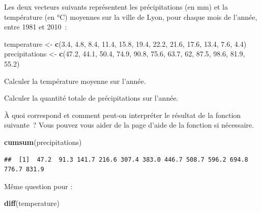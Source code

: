 \documentclass[
  12pt,
]{book}
\newenvironment{Shaded}{\begin{snugshade}}{\end{snugshade}}
\newcommand{\DecValTok}[1]{\textcolor[rgb]{0.00,0.00,0.81}{#1}}
\newcommand{\FloatTok}[1]{\textcolor[rgb]{0.00,0.00,0.81}{#1}}
\newcommand{\KeywordTok}[1]{\textcolor[rgb]{0.13,0.29,0.53}{\textbf{#1}}}
\newcommand{\NormalTok}[1]{#1}
\newcommand{\StringTok}[1]{\textcolor[rgb]{0.31,0.60,0.02}{#1}}
\begin{document}
Les deux vecteurs suivants représentent les précipitations (en mm) et la température (en °C) moyennes sur la ville de Lyon, pour chaque mois de l'année, entre 1981 et 2010~:

\begin{Shaded}
\begin{Highlighting}[]
\NormalTok{temperature \textless{}{-}}\StringTok{ }\KeywordTok{c}\NormalTok{(}\FloatTok{3.4}\NormalTok{, }\FloatTok{4.8}\NormalTok{, }\FloatTok{8.4}\NormalTok{, }\FloatTok{11.4}\NormalTok{, }\FloatTok{15.8}\NormalTok{, }\FloatTok{19.4}\NormalTok{, }\FloatTok{22.2}\NormalTok{, }\FloatTok{21.6}\NormalTok{, }\FloatTok{17.6}\NormalTok{, }\FloatTok{13.4}\NormalTok{, }\FloatTok{7.6}\NormalTok{, }\FloatTok{4.4}\NormalTok{)}
\NormalTok{precipitations \textless{}{-}}\StringTok{ }\KeywordTok{c}\NormalTok{(}\FloatTok{47.2}\NormalTok{, }\FloatTok{44.1}\NormalTok{, }\FloatTok{50.4}\NormalTok{, }\FloatTok{74.9}\NormalTok{, }\FloatTok{90.8}\NormalTok{, }\FloatTok{75.6}\NormalTok{, }\FloatTok{63.7}\NormalTok{, }\DecValTok{62}\NormalTok{, }\FloatTok{87.5}\NormalTok{, }\FloatTok{98.6}\NormalTok{, }\FloatTok{81.9}\NormalTok{, }\FloatTok{55.2}\NormalTok{)}
\end{Highlighting}
\end{Shaded}

Calculer la température moyenne sur l'année.

Calculer la quantité totale de précipitations sur l'année.

À quoi correspond et comment peut-on interpréter le résultat de la fonction suivante~? Vous pouvez vous aider de la page d'aide de la fonction si nécessaire.

\begin{Shaded}
\begin{Highlighting}[]
\KeywordTok{cumsum}\NormalTok{(precipitations)}
\end{Highlighting}
\end{Shaded}

\begin{verbatim}
##  [1]  47.2  91.3 141.7 216.6 307.4 383.0 446.7 508.7 596.2 694.8 776.7 831.9
\end{verbatim}

Même question pour :

\begin{Shaded}
\begin{Highlighting}[]
\KeywordTok{diff}\NormalTok{(temperature)}
\end{Highlighting}
\end{Shaded}
\end{document}
